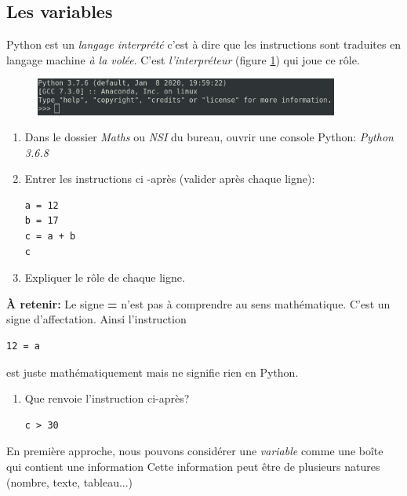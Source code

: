 \documentclass[a4paper,11pt]{article}
\begin{document}
\begin{Form}
\subsection{Les variables}
Python est un \emph{langage interprété} c'est à dire que les instructions sont traduites en langage machine \emph{à la volée}. C'est \emph{l'interpréteur} (figure \ref{console}) qui joue ce rôle.
\begin{figure}[!h]
\centering
\includegraphics[width=10cm]{ressources/console.png}
\label{console}
\end{figure}
\begin{activite}
\begin{enumerate}
\item Dans le dossier \emph{Maths} ou \emph{NSI} du bureau, ouvrir une console Python: \emph{Python 3.6.8}
\item Entrer les instructions ci -après (valider après chaque ligne):
\begin{lstlisting}
a = 12
b = 17
c = a + b
c
\end{lstlisting}
\item Expliquer le rôle de chaque ligne.
\end{enumerate}
\textbf{À retenir:} Le signe \textbf{=} n'est pas à comprendre au sens mathématique. C'est un signe d'affectation. Ainsi l'instruction
\begin{lstlisting}
12 = a
\end{lstlisting}
est juste mathématiquement mais ne signifie rien en Python.
\begin{enumerate}[resume]
\item Que renvoie l'instruction ci-après?
\begin{lstlisting}
c > 30
\end{lstlisting}
\end{enumerate}
\end{activite}
En première approche, nous pouvons considérer une \emph{variable} comme une boîte qui contient une information Cette information peut être de plusieurs natures (nombre, texte, tableau...)

\end{Form}
\end{document}
